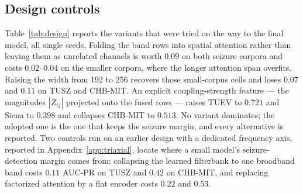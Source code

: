 \subsection{Design controls}
\label{sec:design}

Table~\ref{tab:design} reports the variants that were tried on the way
to the final model, all single seeds. Folding the band rows
into spatial attention rather than leaving them as unrelated channels is
worth $0.09$ on both seizure corpora and costs $0.02$--$0.04$ on the
smaller corpora, where the longer attention span overfits. Raising the
width from 192 to 256 recovers those small-corpus cells and loses
$0.07$ and $0.11$ on TUSZ and CHB-MIT. An explicit coupling-strength
feature --- the magnitudes $|Z_{ij}|$ projected onto the fused rows ---
raises TUEV to $0.721$ and Siena to $0.398$ and collapses CHB-MIT to
$0.513$. No variant dominates; the adopted one is the one that keeps the
seizure margin, and every alternative is reported. Two controls run on an earlier design with a dedicated frequency axis,
reported in Appendix~\ref{app:triaxial}, locate where a small model's
seizure-detection margin comes from: collapsing the learned filterbank to
one broadband band costs $0.11$ AUC-PR on TUSZ and $0.42$ on CHB-MIT, and
replacing factorized attention by a flat encoder costs $0.22$ and $0.53$.

\begin{table}[t]
\centering
\small
\caption{Design variants, single seeds. ``fold'' = band rows
folded into spatial attention; ``strength'' = explicit $|Z|$ feature.}
\label{tab:design}
\end{table}

